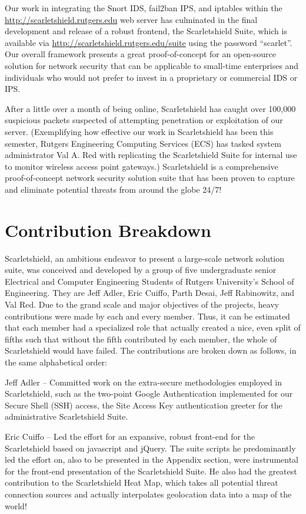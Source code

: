 \documentclass[12pt,letterpaper,titlepage]{report}
\begin{document}
{Our work in integrating the Snort IDS, fail2ban IPS, and iptables within the 
\url{http://scarletshield.rutgers.edu} web server has culminated in the final 
development and release of a robust frontend, the Scarletshield Suite, which is
available via \url{http://scarletshield.rutgers.edu/suite} using the password 
“scarlet”. Our overall framework presents a great proof-of-concept for an open-source
solution for network security that can be applicable to small-time enterprises and
individuals who would not prefer to invest in a proprietary or commercial IDS or IPS. 

After a little over a month of being online, Scarletshield has caught over 100,000 
suspicious packets suspected of attempting penetration or exploitation of our server.
(Exemplifying how effective our work in Scarletshield has been this semester, 
Rutgers Engineering Computing Services (ECS) has tasked system administrator 
Val A. Red with replicating the Scarletshield Suite for internal use to monitor 
wireless access point gateways.)
Scarletshield is a comprehensive proof-of-concept network security solution suite that has 
been proven to capture and eliminate potential threats from around the globe 24/7! 

\section{Contribution Breakdown}

Scarletshield, an ambitious endeavor to present a large-scale network solution
suite,  was conceived and developed by a group of five undergraduate senior
Electrical and Computer Engineering Students of Rutgers University’s School of
Engineering.  They are Jeff Adler, Eric Cuiffo, Parth Desai, Jeff Rabinowitz,
and Val Red.  Due to the grand scale and major objectives of the projects, heavy
contributions were made by each and every member. Thus, it can be estimated that
each member had a specialized role that actually created a nice, even split of
fifths such that without the fifth contributed by each member, the whole of
Scarletshield would have failed. The contributions are broken down as follows,
in the same alphabetical order:

Jeff Adler -- Committed work on the extra-secure methodologies employed in
Scarletshield, such as the two-point Google Authentication implemented for our
Secure Shell (SSH) access, the Site Access Key authentication greeter for the
administrative Scarletshield Suite.

Eric Cuiffo -- Led the effort for an expansive, robust front-end for the
Scarletshield based on javascript and jQuery. The suite scripts he predominantly
led the effort on, also to be presented in the Appendix section, were
instrumental for the front-end presentation of the Scarletshield Suite.  He also
had the greatest contribution to the Scarletshield Heat Map, which takes all
potential threat connection sources and actually interpolates geolocation data
into a map of the world!

}
\end{document}
